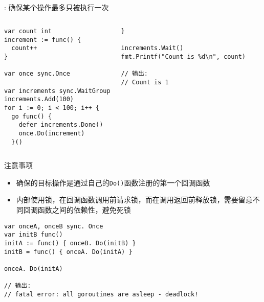 \subsection{\Once }
\begin{frame}[fragile]{\Once }
  : 确保某个操作最多只被执行一次

\begin{columns}[T]
\begin{lstlisting}[caption={\Once 使用样例},xleftmargin=8pt]
var count int
increment := func() {
  count++
}

var once sync.Once

var increments sync.WaitGroup
increments.Add(100)
for i := 0; i < 100; i++ {
  go func() {
    defer increments.Done()
    once.Do(increment)
  }()
\end{lstlisting}

\begin{lstlisting}[caption={\Once 使用样例},firstnumber=last,xleftmargin=8pt]
}

increments.Wait()
fmt.Printf("Count is %d\n", count)

// 输出:
// Count is 1    
\end{lstlisting}
\end{columns}
\end{frame}

\begin{frame}[fragile]{注意事项}
  \begin{itemize}
      \item \Once 确保的目标操作是通过自己的\texttt{Do()}函数注册的第一个回调函数
      \item \Once 内部使用锁，在回调函数调用前请求锁，而在调用返回前释放锁，需要留意不同回调函数之间的依赖性，避免死锁
  \end{itemize}  

\begin{lstlisting}[caption={\Once 的使用不当导致死锁}]
var onceA, onceB sync. Once
var initB func()
initA := func() { onceB. Do(initB) }
initB = func() { onceA. Do(initA) }

onceA. Do(initA)    

// 输出:
// fatal error: all goroutines are asleep - deadlock!
\end{lstlisting}
\end{frame}
